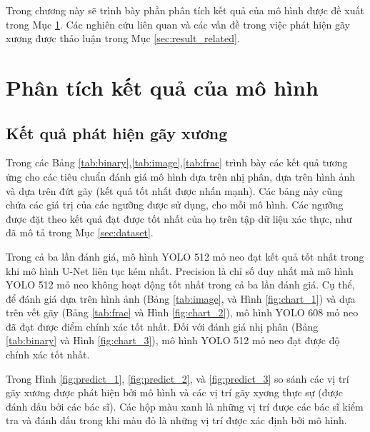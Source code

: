 \documentclass[../the.tex]{subfiles}
\begin{document}
Trong chương này sẽ trình bày phần phân tích kết quả của mô hình được đề xuất trong Mục \ref{sec:result}. Các nghiên cứu liên quan và các vấn đề trong việc phát hiện gãy xương được thảo luận trong Mục \ref{sec:result_related}.

\section{Phân tích kết quả của mô hình}
\label{sec:result}

\subsection{Kết quả phát hiện gãy xương}

{\fontsize{13}{12} \selectfont
Trong các Bảng \ref{tab:binary},\ref{tab:image},\ref{tab:frac} trình bày các kết quả tương ứng cho các tiêu chuẩn đánh giá mô hình dựa trên nhị phân, dựa trên hình ảnh và dựa trên đứt gãy (kết quả tốt nhất được nhấn mạnh). Các bảng này cũng chứa các giá trị của các ngưỡng được sử dụng, cho mỗi mô hình. Các ngưỡng được đặt theo kết quả đạt được tốt nhất của họ trên tập dữ liệu xác thực, như đã mô tả trong Mục \ref{sec:dataset}.

Trong cả ba lần đánh giá, mô hình YOLO 512 mỏ neo đạt kết quả tốt nhất trong khi mô hình U-Net liên tục kém nhất. Precision là chỉ số duy nhất mà mô hình YOLO 512 mỏ neo không hoạt động tốt nhất trong cả ba lần đánh giá. Cụ thể, để đánh giá dựa trên hình ảnh (Bảng \ref{tab:image}, và Hình \ref{fig:chart_1}) và dựa trên vết gãy (Bảng \ref{tab:frac} và Hình \ref{fig:chart_2}), mô hình YOLO 608 mỏ neo đã đạt được điểm chính xác tốt nhất. Đối với đánh giá nhị phân (Bảng \ref{tab:binary} và Hình \ref{fig:chart_3}), mô hình YOLO 512 mỏ neo đạt được độ chính xác tốt nhất.


Trong Hình \ref{fig:predict_1}, \ref{fig:predict_2}, và \ref{fig:predict_3} so sánh các vị trí gãy xương được phát hiện bởi mô hình và các vị trí gãy xyơng thực sự (được đánh dấu bởi các bác sĩ). Các hộp màu xanh là những vị trí được các bác sĩ kiểm tra và đánh dấu trong khi màu đỏ là những vị trí được xác định bởi mô hình.
}
\end{document}
